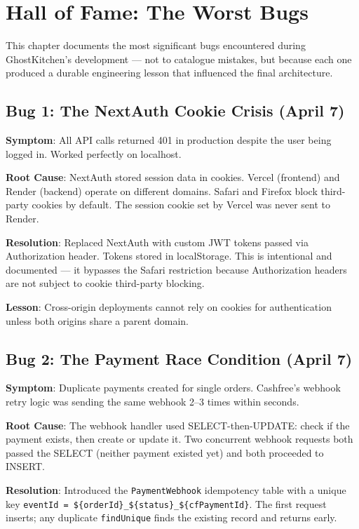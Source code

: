 \documentclass[11pt,a4paper,twoside]{book}
\begin{document}
\section{Hall of Fame: The Worst Bugs}

This chapter documents the most significant bugs encountered during GhostKitchen's
development — not to catalogue mistakes, but because each one produced a durable
engineering lesson that influenced the final architecture.

\subsection{Bug 1: The NextAuth Cookie Crisis (April 7)}

\textbf{Symptom}: All API calls returned 401 in production despite the user being
logged in.  Worked perfectly on localhost.

\textbf{Root Cause}: NextAuth stored session data in cookies.  Vercel (frontend)
and Render (backend) operate on different domains.  Safari and Firefox block
third-party cookies by default.  The session cookie set by Vercel was never
sent to Render.

\textbf{Resolution}: Replaced NextAuth with custom JWT tokens passed via
Authorization header.  Tokens stored in localStorage.  This is intentional and
documented — it bypasses the Safari restriction because Authorization headers
are not subject to cookie third-party blocking.

\textbf{Lesson}: Cross-origin deployments cannot rely on cookies for authentication
unless both origins share a parent domain.

\subsection{Bug 2: The Payment Race Condition (April 7)}

\textbf{Symptom}: Duplicate payments created for single orders.  Cashfree's
webhook retry logic was sending the same webhook 2–3 times within seconds.

\textbf{Root Cause}: The webhook handler used SELECT-then-UPDATE: check if the
payment exists, then create or update it.  Two concurrent webhook requests both
passed the SELECT (neither payment existed yet) and both proceeded to INSERT.

\textbf{Resolution}: Introduced the \texttt{PaymentWebhook} idempotency table with
a unique key \texttt{eventId = \$\{orderId\}\_\$\{status\}\_\$\{cfPaymentId\}}.
The first request inserts; any duplicate \texttt{findUnique} finds the existing
record and returns early.
\end{document}

